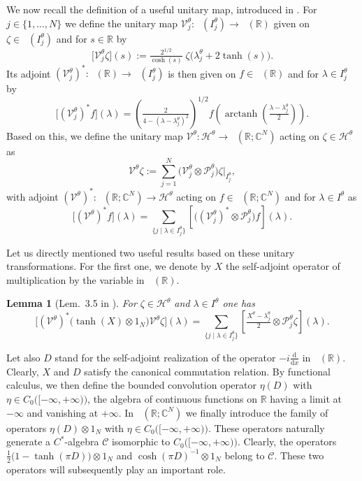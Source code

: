 \documentclass[11pt]{article}
\def\C{\mathbb C}
\def\CC{\mathcal C}
\def\d{\mathrm d}
\def\Hrond{\mathscr H}
\def\P{\mathcal P}
\def\R{\mathbb R}
\def\V{\mathcal V}
\def\ltwo{\mathop{\mathrm{L}^2}\nolimits}
\def\arctanh{\mathop{\mathrm{arctanh}}\nolimits}
\newtheorem{Lemma}[Theorem]{Lemma}
\begin{document}
We now recall the definition of a useful unitary map, introduced in
\cite[Sec.~4.1]{NRT}.
For $j\in\{1,\dots,N\}$ we define the unitary map
$\V_j^\theta:\ltwo(I_j^\theta)\to\ltwo(\R)$ given on $\zeta\in\ltwo(I_j^\theta)$ and for $s\in\R$ by
\begin{equation}\label{eq:Vjt}
\big[\V_j^\theta\zeta\big](s)
:=\tfrac{2^{1/2}}{\cosh(s)}\;\!\zeta\big(\lambda_j^\theta+2\tanh(s)\big).
\end{equation}
Its adjoint $(\V^{\theta}_j)^*:\ltwo(\R)\to\ltwo(I_j^\theta)$ is then given on $f\in\ltwo(\R)$ and for  $\lambda\in I_j^\theta$ by
\begin{equation}\label{eq:Vjt*}
\big[(\V^{\theta}_j)^*f\big](\lambda)
=\left(\tfrac2{4-(\lambda-\lambda_j^\theta)^2}\right)^{1/2}
f\left(\arctanh\left(\tfrac{\lambda-\lambda_j^\theta}2\right)\right).
\end{equation}
Based on this, we define the unitary map
$\V^\theta:\Hrond^\theta\to\ltwo(\R;\C^N)$  acting on $\zeta\in\Hrond^\theta$ as
$$
\V^\theta\zeta
:=\sum_{j=1}^N\big(\V^\theta_j\otimes\P_j^\theta\big)\zeta|_{I^\theta_j},
$$
with adjoint $(\V^{\theta})^*:\ltwo(\R;\C^N)\to\Hrond^\theta$ acting on 
$f\in\ltwo(\R;\C^N)$ and for $\lambda\in I^\theta$ as
$$
\big[(\V^{\theta})^*f\big](\lambda)
=\sum_{\{j\mid\lambda\in I^\theta_j\}}
\left[\big((\V^{\theta}_j)^*\otimes\P_j^\theta\big)f\right](\lambda).
$$

Let us directly mentioned two useful results based on these unitary transformations. For the first one, we denote by $X$ the self-adjoint operator of multiplication by the variable in  $\ltwo(\R)$.

\begin{Lemma}[Lem.~3.5 in \cite{APRR}]\label{lem_tanh}
For  $\zeta\in\Hrond^\theta$ and $\lambda \in I^\theta$ one has
\begin{equation*}
\big[(\V^\theta)^* \big(\tanh(X)\otimes 1_N \big)\V^\theta \zeta\big](\lambda)
= \sum_{\{j\mid\lambda\in I_j^\theta\}}\left[\tfrac{X^\theta-\lambda^\theta_j}{2}\otimes \P_j^\theta \zeta\right](\lambda).
\end{equation*}
\end{Lemma}

Let also $D$ stand for the self-adjoint realization of the operator $-i\frac{\d}{\d x}$ in $\ltwo(\R)$. Clearly, $X$ and $D$ satisfy the canonical commutation relation. By functional calculus, we then define the bounded convolution operator $\eta(D)$ with $\eta\in C_0\big([-\infty,+\infty)\big)$, the algebra of continuous functions on $\R$ having a limit at $-\infty$ and vanishing at $+\infty$.
In $\ltwo(\R;\C^N)$ we finally introduce the family of operators 
$\eta(D)\otimes 1_N$
with $\eta\in  C_0\big([-\infty,+\infty)\big)$. 
These operators naturally generate a $C^*$-algebra $\CC$ isomorphic to  $C_0\big([-\infty,+\infty)\big)$.
Clearly, the operators $\frac{1}{2}\big(1-\tanh(\pi D)\big)\otimes 1_N$ and $\cosh(\pi D)^{-1}\otimes 1_N$ belong to 
$\CC$. These two operators will subsequently play an important role.
\end{document}
